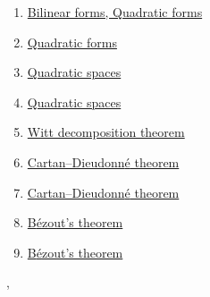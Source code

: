 \documentclass[11pt]{article}
\renewcommand{\today}{\shortmonthname[\the\month] \the \day,  \the\year}
\begin{document}
\begin{enumerate}
	\item 	\href{https://mp.weixin.qq.com/s/8VFyBnxvtOT0T6zGZomirA}{Bilinear forms, Quadratic forms}	%
	\item 	\href{https://mp.weixin.qq.com/s/1Gv6cRXKzAFGcEncz2O3Tg}{Quadratic forms}	%
	\item	\href{https://mp.weixin.qq.com/s/SpzCFc360qbVce6Hb9gdww}{Quadratic spaces}	%
	\item	\href{https://mp.weixin.qq.com/s/dqnoj10bagjxGGaOcjuRvg}{Quadratic spaces}	%
	\item	\href{https://mp.weixin.qq.com/s/UfkrEoPzt_YnkDcSq06pwQ}{Witt decomposition theorem} 	%
	\item 	\href{https://mp.weixin.qq.com/s/Zzr88SF6J0IjXGXFuPV63A}{Cartan–Dieudonn{\'e} theorem}	%
	\item 	\href{https://mp.weixin.qq.com/s/ZGD1vOgfTkLHEoMnytdklA}{Cartan–Dieudonn{\'e} theorem}	%
	\item 	\href{https://mp.weixin.qq.com/s/nCbevyaMrxitlA1SeAMRog}{B{\'e}zout's theorem}	%
	\item 	\href{https://mp.weixin.qq.com/s/bMrcv0cKYuBjsjEqXVvWQQ}{B{\'e}zout's theorem}	%
\end{enumerate}






%
\begin{flushright}
	\tiny \today 
\end{flushright}
\end{document}
